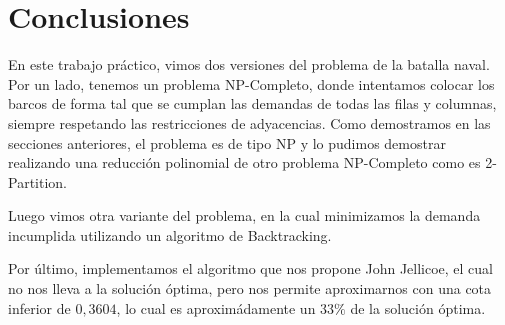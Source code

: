 \section{Conclusiones}

En este trabajo práctico, vimos dos versiones del problema de la batalla naval. Por un lado, tenemos un problema NP-Completo, donde intentamos colocar los barcos de forma tal que se cumplan las demandas de todas las filas y columnas, siempre respetando las restricciones de adyacencias. Como demostramos en las secciones anteriores, el problema es de tipo NP y lo pudimos demostrar realizando una reducción polinomial de otro problema NP-Completo como es 2-Partition.

Luego vimos otra variante del problema, en la cual minimizamos la demanda incumplida utilizando un algoritmo de Backtracking.

Por último, implementamos el algoritmo que nos propone John Jellicoe, el cual no nos lleva a la solución óptima, pero nos permite aproximarnos con una cota inferior de $0,3604$, lo cual es aproximádamente un $33\%$ de la solución óptima.